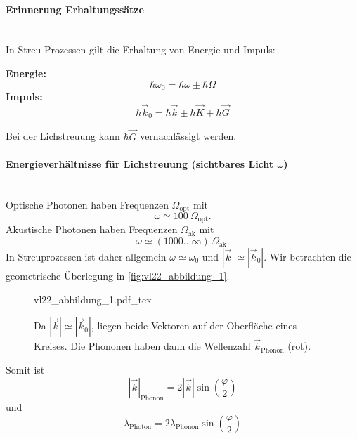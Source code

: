 \setcounter{equation}{24}
\setcounter{section}{5}
\setcounter{subsection}{4}
\setcounter{subsubsection}{1}

\paragraph{Erinnerung Erhaltungssätze}~\\
	In Streu-Prozessen gilt die Erhaltung von Energie und Impuls:
	\begin{important}
		\textbf{Energie:}
		\begin{equation}
			\hbar\omega_0 = \hbar\omega\pm\hbar\Omega
		\end{equation}
		\textbf{Impuls:}
		\begin{equation}
			\hbar\vec k_0 = \hbar\vec k\pm\hbar\vec K+\hbar\vec G
		\end{equation}
	\end{important}
	Bei der Lichstreuung kann $\hbar\vec G$ vernachlässigt werden.

\paragraph{Energieverhältnisse für Lichstreuung (sichtbares Licht $\omega$)}~\\
	Optische Photonen haben Frequenzen $\Omega_\mathrm{opt}$ mit  
	$$
		\omega \simeq \SI{100}{\Omega_{\text{opt}}}.
	$$
	Akustische Photonen haben Frequenzen $\Omega_\mathrm{ak}$ mit
	$$
		\omega \simeq (1000\ldots\infty)\,\Omega_\mathrm{ak}.
	$$
	In Streuprozessen ist daher allgemein $\omega\simeq\omega_0$ und $|\vec k|\simeq|\vec k_0|$. 
	Wir betrachten die geometrische Überlegung in \autoref{fig:vl22_abbildung_1}.
	\begin{figure}[H]
		\centering
		\def\svgwidth{.434\columnwidth}
		{vl22_abbildung_1.pdf_tex}
		\caption{Da $|\vec k|\simeq|\vec k_0|$, liegen beide Vektoren auf der Oberfläche eines Kreises. Die Phononen haben dann die Wellenzahl $\vec k_\mathrm{Phonon}$ (rot).}
		\label{fig:vl22_abbildung_1}
	\end{figure}
	Somit ist
	$$
		|\Vec{k}|_{\text{Phonon}} = 2 |\Vec{k}| \sin\left( \frac{\varphi}{2} \right)
	$$
	und
	$$
		\lambda_{\text{Photon}} = 2 \lambda_{\text{Phonon}} \sin\left( \frac\varphi2 \right)
	$$ 

